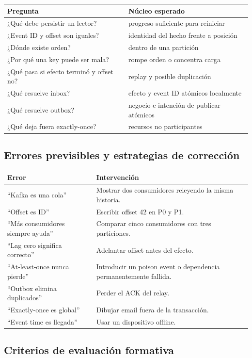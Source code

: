\documentclass[variant=docente,cover=institutional,mode=screen]{ua-engineering-v6-article}
\begin{document}
\begin{tabular}{p{}p{}}
\toprule
Pregunta & Núcleo esperado \\
\midrule
¿Qué debe persistir un lector? & progreso suficiente para reiniciar \\
¿Event ID y offset son iguales? & identidad del hecho frente a posición \\
¿Dónde existe orden? & dentro de una partición \\
¿Por qué una key puede ser mala? & rompe orden o concentra carga \\
¿Qué pasa si efecto terminó y offset no? & replay y posible duplicación \\
¿Qué resuelve inbox? & efecto y event ID atómicos localmente \\
¿Qué resuelve outbox? & negocio e intención de publicar atómicos \\
¿Qué deja fuera exactly-once? & recursos no participantes \\
\bottomrule
\end{tabular}

\subsection{Errores previsibles y estrategias de corrección}

\begin{tabular}{p{}p{}}
\toprule
Error & Intervención \\
\midrule
``Kafka es una cola'' & Mostrar dos consumidores releyendo la misma historia. \\
``Offset es ID'' & Escribir offset 42 en P0 y P1. \\
``Más consumidores siempre ayuda'' & Comparar cinco consumidores con tres particiones. \\
``Lag cero significa correcto'' & Adelantar offset antes del efecto. \\
``At-least-once nunca pierde'' & Introducir un poison event o dependencia permanentemente fallida. \\
``Outbox elimina duplicados'' & Perder el ACK del relay. \\
``Exactly-once es global'' & Dibujar email fuera de la transacción. \\
``Event time es llegada'' & Usar un dispositivo offline. \\
\bottomrule
\end{tabular}

\subsection{Criterios de evaluación formativa}
\end{document}
